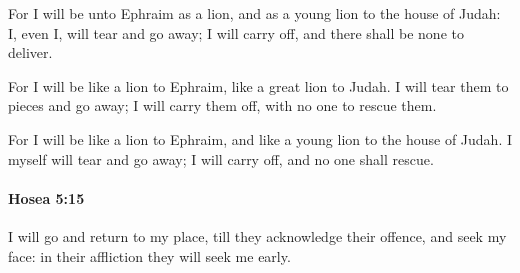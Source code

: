 			\begin{versebox}
					\item[BHS] 
					\item[LXX] 
					\item[ASV] For I will be unto Ephraim as a lion, and as a young lion to the house of Judah: I, even I, will tear and go away; I will carry off, and there shall be none to deliver.
					\item[NIV] For I will be like a lion to Ephraim, like a great lion to Judah. I will tear them to pieces and go away; I will carry them off, with no one to rescue them.
					\item[NRSV] For I will be like a lion to Ephraim, and like a young lion to the house of Judah. I myself will tear and go away; I will carry off, and no one shall rescue.
			\end{versebox}

		\paragraph{Hosea 5:15} %
			\label{HOSEA-5-15}

			I will go and return to my place, till they acknowledge their offence, and seek my face: in their affliction they will seek me early.

